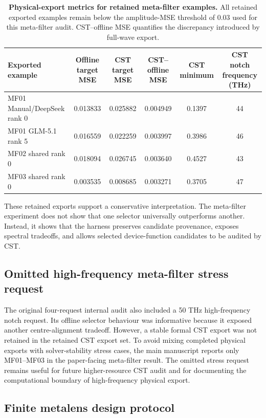 \documentclass[final,1p,times]{elsarticle}
\begin{document}
\begin{table}[htbp!]
\centering
\caption{\textbf{Physical-export metrics for retained meta-filter examples.}
All retained exported examples remain below the amplitude-MSE threshold of 0.03 used for this meta-filter audit. CST--offline MSE quantifies the discrepancy introduced by full-wave export.}
\label{tab:si_phase6_metafilter_cst}
\small
\setlength{\tabcolsep}{4.2pt}
\renewcommand{\arraystretch}{1.12}
\begin{tabular}{lccccc}
\toprule
Exported example & Offline target MSE & CST target MSE & CST--offline MSE & CST minimum & CST notch frequency (THz) \\
\midrule
MF01 Manual/DeepSeek rank 0 & 0.013833 & 0.025882 & 0.004949 & 0.1397 & 44 \\
MF01 GLM-5.1 rank 5 & 0.016559 & 0.022259 & 0.003997 & 0.3986 & 46 \\
MF02 shared rank 0 & 0.018094 & 0.026745 & 0.003640 & 0.4527 & 43 \\
MF03 shared rank 0 & 0.003535 & 0.008685 & 0.003271 & 0.3705 & 47 \\
\bottomrule
\end{tabular}
\end{table}

These retained exports support a conservative interpretation. The meta-filter experiment does not show that one selector universally outperforms another. Instead, it shows that the harness preserves candidate provenance, exposes spectral tradeoffs, and allows selected device-function candidates to be audited by CST.

\subsection{Omitted high-frequency meta-filter stress request}

The original four-request internal audit also included a 50 THz high-frequency notch request. Its offline selector behaviour was informative because it exposed another centre-alignment tradeoff. However, a stable formal CST export was not retained in the retained CST export set. To avoid mixing completed physical exports with solver-stability stress cases, the main manuscript reports only MF01--MF03 in the paper-facing meta-filter result. The omitted stress request remains useful for future higher-resource CST audit and for documenting the computational boundary of high-frequency physical export.

\subsection{Finite metalens design protocol}
\end{document}
